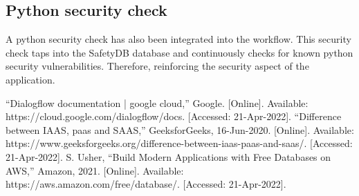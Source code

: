 \documentclass[conference]{IEEEtran}
\begin{document}
\subsection*{Python security check}
A python security check has also been integrated into the workflow. This security check taps into the SafetyDB database and continuously checks for known python security vulnerabilities. Therefore, reinforcing the security aspect of the application.

\begin{thebibliography}{00}
 “Dialogflow documentation  |  google cloud,” Google. [Online]. Available: https://cloud.google.com/dialogflow/docs. [Accessed: 21-Apr-2022]. 
 “Difference between IAAS, paas and SAAS,” GeeksforGeeks, 16-Jun-2020. [Online]. Available: https://www.geeksforgeeks.org/difference-between-iaas-paas-and-saas/. [Accessed: 21-Apr-2022]. 
 S. Usher, “Build Modern Applications with Free Databases on AWS,” Amazon, 2021. [Online]. Available: https://aws.amazon.com/free/database/. [Accessed: 21-Apr-2022]. 
\end{thebibliography}
\end{document}
